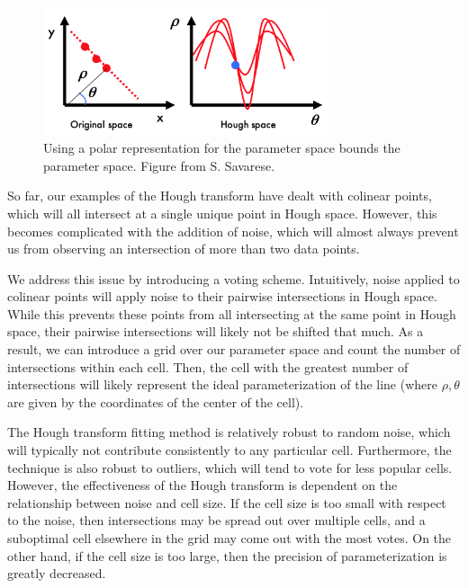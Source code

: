 \documentclass[a4paper, 12pt]{article}
\begin{document}
\begin{figure}[h!]
\centering
\includegraphics[width=0.75\textwidth]{figures/hough-polar}
\caption{Using a polar representation for the parameter space bounds the parameter space.  Figure from S. Savarese.}
\end{figure}

So far, our examples of the Hough transform have dealt with colinear points, which will all intersect at a single unique point in Hough space.  However, this becomes complicated with the addition of noise, which will almost always prevent us from observing an intersection of more than two data points.

We address this issue by introducing a voting scheme.  Intuitively, noise applied to colinear points will apply noise to their pairwise intersections in Hough space.  While this prevents these points from all intersecting at the same point in Hough space, their pairwise intersections will likely not be shifted that much.  As a result, we can introduce a grid over our parameter space and count the number of intersections within each cell.  Then, the cell with the greatest number of intersections will likely represent the ideal parameterization of the line (where $\rho, \theta$ are given by the coordinates of the center of the cell).

The Hough transform fitting method is relatively robust to random noise, which will typically not contribute consistently to any particular cell.  Furthermore, the technique is also robust to outliers, which will tend to vote for less popular cells.  However, the effectiveness of the Hough transform is dependent on the relationship between noise and cell size.  If the cell size is too small with respect to the noise, then intersections may be spread out over multiple cells, and a suboptimal cell elsewhere in the grid may come out with the most votes.  On the other hand, if the cell size is too large, then the precision of parameterization is greatly decreased. 
\end{document}
